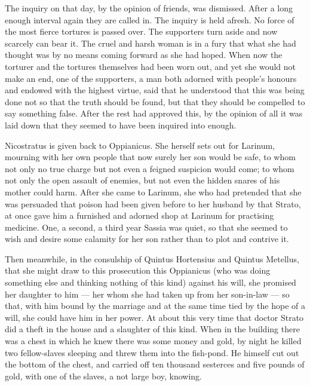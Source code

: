  The inquiry on that day, by the opinion of friends, was dismissed. After a long enough interval again they are called in. The inquiry is held afresh. No force of the most fierce tortures is passed over. The supporters turn aside and now scarcely can bear it. The cruel and harsh woman is in a fury that what she had thought was by no means coming forward as she had hoped. When now the torturer and the tortures themselves had been worn out, and yet she would not make an end, one of the supporters, a man both adorned with people's honours and endowed with the highest virtue, said that he understood that this was being done not so that the truth should be found, but that they should be compelled to say something false. After the rest had approved this, by the opinion of all it was laid down that they seemed to have been inquired into enough.

 Nicostratus is given back to Oppianicus. She herself sets out for Larinum, mourning with her own people that now surely her son would be safe, to whom not only no true charge but not even a feigned suspicion would come; to whom not only the open assault of enemies, but not even the hidden snares of his mother could harm. After she came to Larinum, she who had pretended that she was persuaded that poison had been given before to her husband by that Strato, at once gave him a furnished and adorned shop at Larinum for practising medicine. One, a second, a third year Sassia was quiet, so that she seemed to wish and desire some calamity for her son rather than to plot and contrive it.

 Then meanwhile, in the consulship of Quintus Hortensius and Quintus Metellus, that she might draw to this prosecution this Oppianicus (who was doing something else and thinking nothing of this kind) against his will, she promised her daughter to him --- her whom she had taken up from her son-in-law --- so that, with him bound by the marriage and at the same time tied by the hope of a will, she could have him in her power. At about this very time that doctor Strato did a theft in the house and a slaughter of this kind. When in the building there was a chest in which he knew there was some money and gold, by night he killed two fellow-slaves sleeping and threw them into the fish-pond. He himself cut out the bottom of the chest, and carried off ten thousand sesterces and five pounds of gold, with one of the slaves, a not large boy, knowing.

